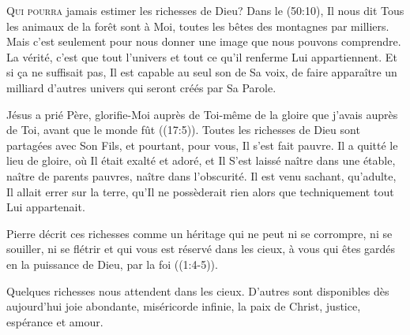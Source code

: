 

\lettrine{Q}{ui pourra} jamais estimer les richesses de Dieu?
 Dans le (50:10), Il nous dit\frcolon{} 
 \Og Tous les animaux de la forêt sont à Moi,
 toutes les bêtes des montagnes par milliers. \Fg{}
 Mais c'est seulement pour nous donner une image que nous pouvons comprendre.
 La vérité, c'est que tout l'univers et tout ce qu'il renferme
 Lui appartiennent. Et si \c{c}a ne suffisait pas, Il est capable au seul son
 de Sa voix, de faire apparaître un milliard d'autres univers
 qui seront créés par Sa Parole.

Jésus a prié\frcolon{} 
 \Og Père, glorifie-Moi auprès de Toi-même de la gloire
 que j'avais auprès de Toi, avant que le monde fût \Fg{}
 ((17:5)).
 Toutes les richesses de Dieu sont partagées avec Son Fils, et pourtant,
 pour vous, Il s'est fait pauvre. Il a quitté le lieu de gloire,
 où Il était exalté et adoré, et Il S'est laissé naître dans une étable,
 naître de parents pauvres, naître dans l'obscurité.
 Il est venu sachant, qu'adulte, Il allait errer sur la terre,
 qu'Il ne possèderait rien alors que techniquement tout Lui appartenait.


Pierre décrit ces richesses comme \Og un héritage qui ne peut ni se corrompre,
 ni se souiller, ni se flétrir et qui vous est réservé dans les cieux,
 à vous qui êtes gardés en la puissance de Dieu, par la foi \Fg{}
 ((1:4-5)). 

Quelques richesses nous attendent dans les cieux.
 D'autres sont disponibles dès aujourd'hui\frcolon{}
 joie abondante, miséricorde infinie, la paix de Christ,
 justice, espérance et amour.

\dvrule




